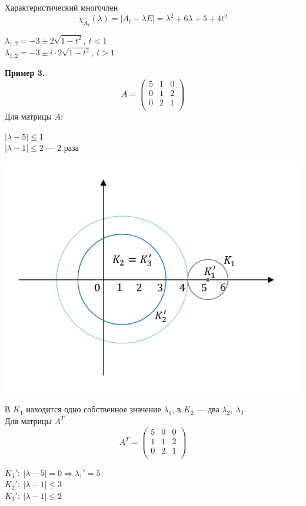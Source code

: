 \documentclass[12pt]{article}
\theoremstyle{definition}
\numberwithin{equation}{section}
\begin{document}
	Характеристический многочлен $$\chi_{A_t}(\lambda)=|A_t-\lambda E|=\lambda^2+6\lambda+5+4t^2$$
	\begin{center}
		$\lambda_{1,2}=-3\pm 2\sqrt{1-t^2},~t<1$\\
		$\lambda_{1,2}=-3\pm i\cdot 2\sqrt{1-t^2},~t>1$
	\end{center}
	\textbf{Пример 3.}\\
	\[A=\begin{pmatrix}
	5 & 1 & 0 \\
	0 & 1 & 2 \\
	0 & 2 & 1 \\
	\end{pmatrix}\]
	Для матрицы $A$:
	\begin{center}
		$|\lambda-5|\leqslant 1$\\
		$|\lambda-1|\leqslant 2$ --- 2 раза
	\end{center}
	\begin{center}
		\includegraphics[scale=0.8]{l9_6.png}
	\end{center}
	В $K_1$ находится одно собственное значение $\lambda_1$, в $K_2$ --- два $\lambda_2,~\lambda_3$.\\
	Для матрицы $A^T$
	\[A^T=\begin{pmatrix}
	5 & 0 & 0 \\
	1 & 1 & 2 \\
	0 & 2 & 1 \\
	\end{pmatrix}\]
	\begin{center}
		$K_1':~|\lambda-5|=0 \Rightarrow \lambda_1'=5$\\
		$K_2':~|\lambda-1|\leqslant 3$\\
		$K_3':~|\lambda-1|\leqslant 2$
	\end{center}
\end{document}

